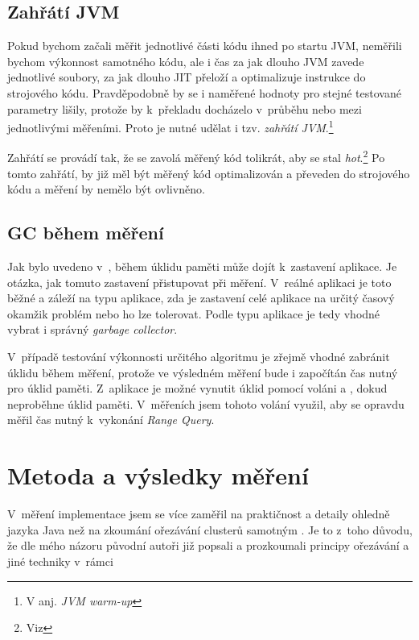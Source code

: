 \subsection{Zahřátí JVM}

Pokud bychom začali měřit jednotlivé části kódu ihned po startu JVM, neměřili bychom výkonnost samotného kódu, ale i čas za jak dlouho JVM zavede jednotlivé \classfile soubory, za jak dlouho JIT přeloží a optimalizuje instrukce \bytecode{} do strojového kódu. Pravděpodobně by se i naměřené hodnoty pro stejné testované parametry lišily, protože by k~překladu docházelo v~průběhu nebo mezi jednotlivými měřeními. Proto je nutné udělat i tzv. \emph{zahřátí JVM}.\footnote{V anj. \emph{JVM warm-up}}

Zahřátí se provádí tak, že se zavolá měřený kód tolikrát, aby se stal \emph{hot}.\footnote{Viz } Po tomto zahřátí, by již měl být měřený kód optimalizován a převeden do strojového kódu a měření by nemělo být ovlivněno.

\subsection{GC během měření}
Jak bylo uvedeno v~, během úklidu paměti může dojít k~zastavení aplikace.
Je otázka, jak tomuto zastavení přistupovat při měření.
V~reálné aplikaci je toto běžné a záleží na typu aplikace, zda je zastavení celé aplikace na určitý časový okamžik problém nebo ho lze tolerovat.
Podle typu aplikace je tedy vhodné vybrat i správný \emph{garbage collector}.

V~případě testování výkonnosti určitého algoritmu je zřejmě vhodné zabránit úklidu během měření, protože ve výsledném měření bude i započítán čas nutný pro úklid paměti.
Z~aplikace je možné vynutit úklid pomocí voláni  a , dokud neproběhne úklid paměti.
V~měřeních jsem tohoto volání využil, aby se opravdu měřil čas nutný k~vykonání \emph{Range Query}.

\section{Metoda a výsledky měření}
V~měření implementace  jsem se více zaměřil na praktičnost a detaily ohledně jazyka Java než na zkoumání ořezávání clusterů samotným .
Je to z~toho důvodu, že dle mého názoru původní autoři již popsali a prozkoumali principy ořezávání a jiné techniky v~rámci \MIndex{}
 
